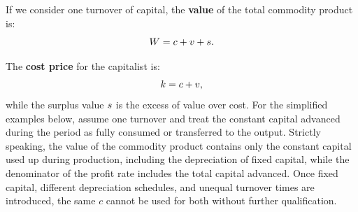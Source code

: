 If we consider one turnover of capital, the \textbf{value} of the total
commodity product is:
\begin{equation}
  W = c + v + s.
  \label{eq:total-value}
\end{equation}

The \textbf{cost price} for the capitalist is:
\begin{equation}
  k = c + v,
\end{equation}
while the surplus value $s$ is the excess of value over cost. For the simplified examples below, assume one turnover and treat the constant capital advanced during the period as fully consumed or transferred to the output. Strictly speaking, the value of the commodity product contains only the constant capital used up during production, including the depreciation of fixed capital, while the denominator of the profit rate includes the total capital advanced. Once fixed capital, different depreciation schedules, and unequal turnover times are introduced, the same \(c\) cannot be used for both without further qualification.


